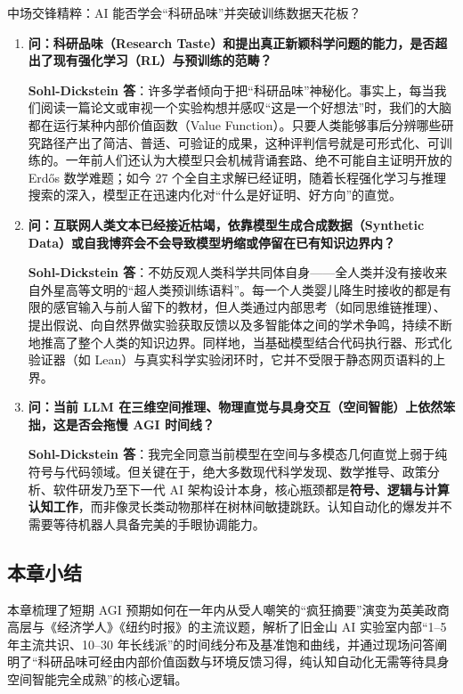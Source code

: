 \documentclass[a4paper]{article}
\begin{document}
\begin{knowledgebox}{中场交锋精粹：AI 能否学会“科研品味”并突破训练数据天花板？}
\begin{enumerate}
    \item \textbf{问：科研品味（Research Taste）和提出真正新颖科学问题的能力，是否超出了现有强化学习（RL）与预训练的范畴？}
    
    \textbf{Sohl-Dickstein 答}：许多学者倾向于把“科研品味”神秘化。事实上，每当我们阅读一篇论文或审视一个实验构想并感叹“这是一个好想法”时，我们的大脑都在运行某种内部价值函数（Value Function）。只要人类能够事后分辨哪些研究路径产出了简洁、普适、可验证的成果，这种评判信号就是可形式化、可训练的。一年前人们还认为大模型只会机械背诵套路、绝不可能自主证明开放的 Erdős 数学难题；如今 27 个全自主求解已经证明，随着长程强化学习与推理搜索的深入，模型正在迅速内化对“什么是好证明、好方向”的直觉。

    \item \textbf{问：互联网人类文本已经接近枯竭，依靠模型生成合成数据（Synthetic Data）或自我博弈会不会导致模型坍缩或停留在已有知识边界内？}
    
    \textbf{Sohl-Dickstein 答}：不妨反观人类科学共同体自身——全人类并没有接收来自外星高等文明的“超人类预训练语料”。每一个人类婴儿降生时接收的都是有限的感官输入与前人留下的教材，但人类通过内部思考（如同思维链推理）、提出假说、向自然界做实验获取反馈以及多智能体之间的学术争鸣，持续不断地推高了整个人类的知识边界。同样地，当基础模型结合代码执行器、形式化验证器（如 Lean）与真实科学实验闭环时，它并不受限于静态网页语料的上界。

    \item \textbf{问：当前 LLM 在三维空间推理、物理直觉与具身交互（空间智能）上依然笨拙，这是否会拖慢 AGI 时间线？}
    
    \textbf{Sohl-Dickstein 答}：我完全同意当前模型在空间与多模态几何直觉上弱于纯符号与代码领域。但关键在于，绝大多数现代科学发现、数学推导、政策分析、软件研发乃至下一代 AI 架构设计本身，核心瓶颈都是\textbf{符号、逻辑与计算认知工作}，而非像灵长类动物那样在树林间敏捷跳跃。认知自动化的爆发并不需要等待机器人具备完美的手眼协调能力。
\end{enumerate}
\end{knowledgebox}

\subsection{本章小结}
本章梳理了短期 AGI 预期如何在一年内从受人嘲笑的“疯狂摘要”演变为英美政商高层与《经济学人》《纽约时报》的主流议题，解析了旧金山 AI 实验室内部“1--5 年主流共识、10--30 年长线派”的时间线分布及基准饱和曲线，并通过现场问答阐明了“科研品味可经由内部价值函数与环境反馈习得，纯认知自动化无需等待具身空间智能完全成熟”的核心逻辑。
\end{document}
